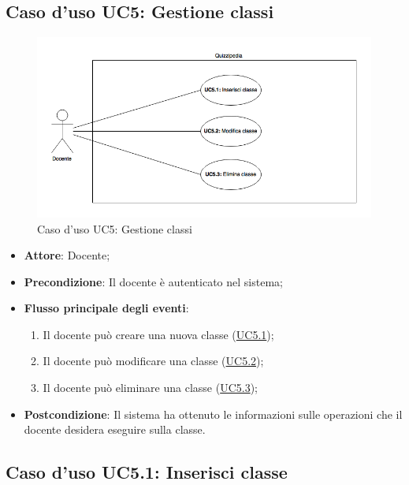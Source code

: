 \documentclass[12pt,a4paper]{article}
\begin{document}
\subsection{Caso d'uso UC5: Gestione classi}
\begin{figure}[H]
	\centering
	\includegraphics[width=\textwidth]{../img/diagramUC5.png}
	\caption{Caso d'uso UC5: Gestione classi}\label{fig:UC5} 
\end{figure}
\begin{itemize}

\item \textbf{Attore}: Docente; 
\item \textbf{Precondizione}: Il docente è autenticato nel sistema;

\item \textbf{Flusso principale degli eventi}:
\begin{enumerate}
	\item Il docente può creare una nuova classe (\hyperlink{UC5.1}{UC5.1});
	\item Il docente può modificare una classe (\hyperlink{UC5.2}{UC5.2});
	\item Il docente può eliminare una classe (\hyperlink{UC5.3}{UC5.3});
	
\end{enumerate}
\item \textbf{Postcondizione}: Il sistema ha ottenuto le informazioni sulle operazioni che il docente desidera eseguire sulla classe.
\end{itemize}
\hypertarget{UC5.1}{}
\subsection{Caso d'uso UC5.1: Inserisci classe}
\end{document}
